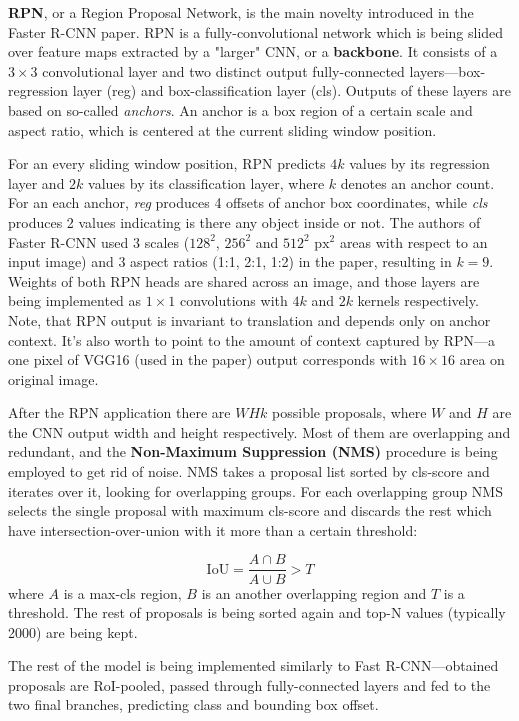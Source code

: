 \documentclass[thesis=B,english]{FITthesis}[2019/12/23]
\begin{document}
\textbf{RPN}, or a Region Proposal Network, is the main novelty introduced in the Faster R-CNN paper. RPN is a fully-convolutional network which is being slided over feature maps extracted by a "larger" CNN, or a \textbf{backbone}. It consists of a $3 \times 3$ convolutional layer and two distinct output fully-connected layers---box-regression layer (reg) and box-classification layer (cls). Outputs of these layers are based on so-called \textit{anchors}. An anchor is a box region of a certain scale and aspect ratio, which is centered at the current sliding window position.

For an every sliding window position, RPN predicts $4k$ values by its regression layer and $2k$ values by its classification layer, where $k$ denotes an anchor count. For an each anchor, \textit{reg} produces 4 offsets of anchor box coordinates, while \textit{cls} produces 2 values indicating is there any object inside or not. The authors of Faster R-CNN used 3 scales ($128^2$, $256^2$ and $512^2$ $\text{px}^2$ areas with respect to an input image) and 3 aspect ratios (1:1, 2:1, 1:2) in the paper, resulting in $k = 9$. Weights of both RPN heads are shared across an image, and those layers are being implemented as $1 \times 1$ convolutions with $4k$ and $2k$ kernels respectively. Note, that RPN output is invariant to translation and depends only on anchor context. It's also worth to point to the amount of context captured by RPN---a one pixel of VGG16 (used in the paper) output corresponds with $16 \times 16$ area on original image.

After the RPN application there are $WHk$ possible proposals, where $W$ and $H$ are the CNN output width and height respectively. Most of them are overlapping and redundant, and the \textbf{Non-Maximum Suppression (NMS)} procedure is being employed to get rid of noise. NMS takes a proposal list sorted by cls-score and iterates over it, looking for overlapping groups. For each overlapping group NMS selects the single proposal with maximum cls-score and discards the rest which have intersection-over-union with it more than a certain threshold:

\[\text{IoU} = \frac{A \cap B}{A \cup B} > T\]
where $A$ is a max-cls region, $B$ is an another overlapping region and $T$ is a threshold. The rest of proposals is being sorted again and top-N values (typically 2000) are being kept.

The rest of the model is being implemented similarly to Fast R-CNN---obtained proposals are RoI-pooled, passed through fully-connected layers and fed to the two final branches, predicting class and bounding box offset.
\end{document}
